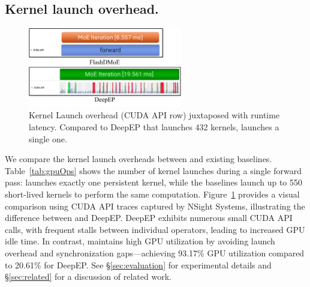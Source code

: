 \subsection{Kernel launch overhead.}\label{subsec:kernel-launch-overhead.}
\begin{figure}[!h]
    \centering
    \includegraphics[width=0.6\textwidth, keepaspectratio]{figures/kernel_launch}
    \caption{Kernel Launch overhead (CUDA API row) juxtaposed with runtime latency.
    Compared to DeepEP that launches 432 kernels, \sysname launches a single one.}
    \label{fig:kl}
\end{figure}
We compare the kernel launch overheads between \sysname and existing baselines.
Table~\ref{tab:gpuOps} shows the number of kernel launches during a single forward pass: \sysname launches exactly one persistent kernel, while the baselines launch up to 550 short-lived kernels to perform the same computation.
Figure~\ref{fig:kl} provides a visual comparison using CUDA API traces captured by NSight Systems, illustrating the difference between \sysname and DeepEP.
DeepEP exhibits numerous small CUDA API calls, with frequent stalls between individual operators, leading to increased GPU idle time.
In contrast, \sysname maintains high GPU utilization by avoiding launch overhead and synchronization gaps—achieving 93.17\% GPU utilization compared to 20.61\% for DeepEP. See \S\ref{sec:evaluation} for experimental details and \S\ref{sec:related} for a discussion of related work.